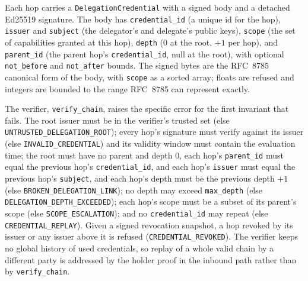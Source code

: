 Each hop carries a \texttt{DelegationCredential} with a signed body and a detached Ed25519
signature. The body has \texttt{credential\_id} (a unique id for the hop), \texttt{issuer}
and \texttt{subject} (the delegator's and delegate's public keys), \texttt{scope} (the set of
capabilities granted at this hop), \texttt{depth} (0 at the root, $+1$ per hop),
and \texttt{parent\_id} (the parent hop's \texttt{credential\_id}, null at the root), with
optional \texttt{not\_before} and \texttt{not\_after} bounds. The signed bytes are the RFC~8785
\citep{jcs2020} canonical form of the body, with \texttt{scope} as a sorted array; floats are
refused and integers are bounded to the range RFC~8785 can represent exactly.

The verifier, \texttt{verify\_chain}, raises the specific error for the first invariant that
fails. The root issuer must be in the verifier's trusted set (else
\texttt{UNTRUSTED\_DELEGATION\_ROOT}); every hop's signature must verify against its issuer
(else \texttt{INVALID\_CREDENTIAL}) and its validity window must contain the evaluation time;
the root must have no parent and depth 0, each hop's \texttt{parent\_id} must equal the
previous hop's \texttt{credential\_id}, and each hop's \texttt{issuer} must equal the previous
hop's \texttt{subject}, and each hop's depth must be the previous depth $+1$ (else
\texttt{BROKEN\_DELEGATION\_LINK}); no depth may exceed \texttt{max\_depth} (else
\texttt{DELEGATION\_DEPTH\_EXCEEDED});
each hop's scope must be a subset of its parent's scope (else \texttt{SCOPE\_ESCALATION});
and no \texttt{credential\_id} may repeat (else \texttt{CREDENTIAL\_REPLAY}). Given a signed
revocation snapshot, a hop revoked by its issuer or any issuer above it is refused
(\texttt{CREDENTIAL\_REVOKED}). The verifier keeps no global history of used credentials, so
replay of a whole valid chain by a different party is addressed by the holder proof in the
inbound path rather than by \texttt{verify\_chain}.

